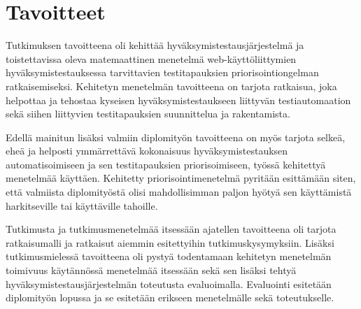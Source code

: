 \section{Tavoitteet} \label{ch:06_tavoitteet}

  Tutkimuksen tavoitteena oli kehittää hyväksymistestausjärjestelmä ja toistettavissa oleva matemaattinen menetelmä web-käyttöliittymien hyväksymistestauksessa tarvittavien testitapauksien priorisointiongelman ratkaisemiseksi.
  Kehitetyn menetelmän tavoitteena on tarjota ratkaisua, joka helpottaa ja tehostaa kyseisen hyväksymistestaukseen liittyvän testiautomaation sekä siihen liittyvien testitapauksien suunnittelua ja rakentamista.

  Edellä mainitun lisäksi valmiin diplomityön tavoitteena on myös tarjota selkeä, eheä ja helposti ymmärrettävä kokonaisuus hyväksymistestauksen automatisoimiseen ja sen testitapauksien priorisoimiseen, työssä kehitettyä menetelmää käyttäen.
  Kehitetty priorisointimenetelmä pyritään esittämään siten, että valmiista diplomityöstä olisi mahdollisimman paljon hyötyä sen käyttämistä harkitseville tai käyttäville tahoille.

  Tutkimusta ja tutkimusmenetelmää itsessään ajatellen tavoitteena oli tarjota ratkaisumalli ja ratkaisut aiemmin esitettyihin tutkimuskysymyksiin.
  Lisäksi tutkimusmielessä tavoitteena oli pystyä todentamaan kehitetyn menetelmän toimivuus käytännössä menetelmää itsessään sekä sen lisäksi tehtyä hyväksymistestausjärjestelmän toteutusta evaluoimalla.
  Evaluointi esitetään diplomityön lopussa ja se esitetään erikseen menetelmälle sekä toteutukselle.
